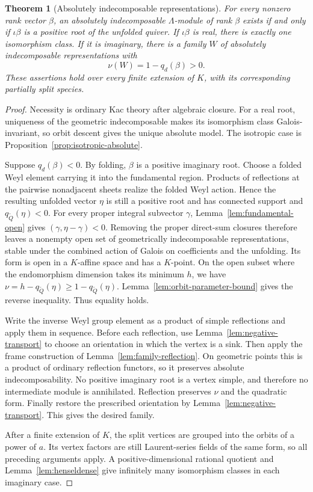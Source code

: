 \documentclass[11pt, reqno]{amsart}
\numberwithin{equation}{section}
\newtheorem{theorem}{Theorem}[section]
\theoremstyle{definition}
\theoremstyle{remark}
\newcommand{\Qbar}{\widetilde Q}
\begin{document}
\begin{theorem}[Absolutely indecomposable representations]
\label{thm:absolute-root}
For every nonzero rank vector $\beta$, an absolutely
indecomposable $\Lambda$-module of rank $\beta$ exists if and
only if $\iota\beta$ is a positive root of the unfolded quiver.
If $\iota\beta$ is real, there is exactly one isomorphism class.
If it is imaginary, there is a family $W$ of absolutely indecomposable
representations with
\[ \nu(W)=1-q_d(\beta)>0. \]
These assertions hold over every finite extension of $K$, with
its corresponding partially split species.
\end{theorem}
\begin{proof}
Necessity is ordinary Kac theory after algebraic closure. For a
real root, uniqueness of the geometric indecomposable makes its
isomorphism class Galois-invariant, so orbit descent gives the
unique absolute model. The isotropic case is
Proposition~\ref{prop:isotropic-absolute}.

Suppose $q_d(\beta)<0$. By folding, $\beta$ is a positive
imaginary root. Choose a folded Weyl element carrying it into
the fundamental region. Products of reflections at the pairwise
nonadjacent sheets realize the folded Weyl action. Hence the
resulting unfolded vector $\eta$ is still a positive root and
has connected support and $q_{\Qbar}(\eta)<0$. For every
proper integral subvector $\gamma$, Lemma~\ref{lem:fundamental-open} gives
$(\gamma,\eta-\gamma)<0$.
Removing the proper direct-sum closures therefore leaves a
nonempty open set of geometrically indecomposable representations,
stable under the combined action of Galois on coefficients and
the unfolding. Its form is open in a $K$-affine
space and has a $K$-point. On the open subset where the endomorphism dimension takes its minimum
$h$, we have $\nu=h-q_{\Qbar}(\eta)\ge1-q_{\Qbar}(\eta)$.
Lemma~\ref{lem:orbit-parameter-bound} gives the reverse inequality.
Thus equality holds.

Write the inverse Weyl group element as a product of simple
reflections and apply them in sequence. Before each reflection, use
Lemma~\ref{lem:negative-transport} to choose an orientation in which
the vertex is a sink. Then apply the frame construction of
Lemma~\ref{lem:family-reflection}.
On geometric points this is a product of ordinary reflection
functors, so it preserves absolute indecomposability. No positive
imaginary root is a vertex simple, and therefore no intermediate
module is annihilated. Reflection preserves $\nu$ and the
quadratic form. Finally restore the prescribed orientation by
Lemma~\ref{lem:negative-transport}. This gives the desired family.

After a finite extension of $K$, the split vertices are grouped
into the orbits of a power of $a$. Its vertex factors are still
Laurent-series fields of the same form, so all preceding arguments
apply. A positive-dimensional rational quotient and
Lemma~\ref{lem:henseldense} give infinitely many isomorphism
classes in each imaginary case.
\end{proof}
\end{document}
